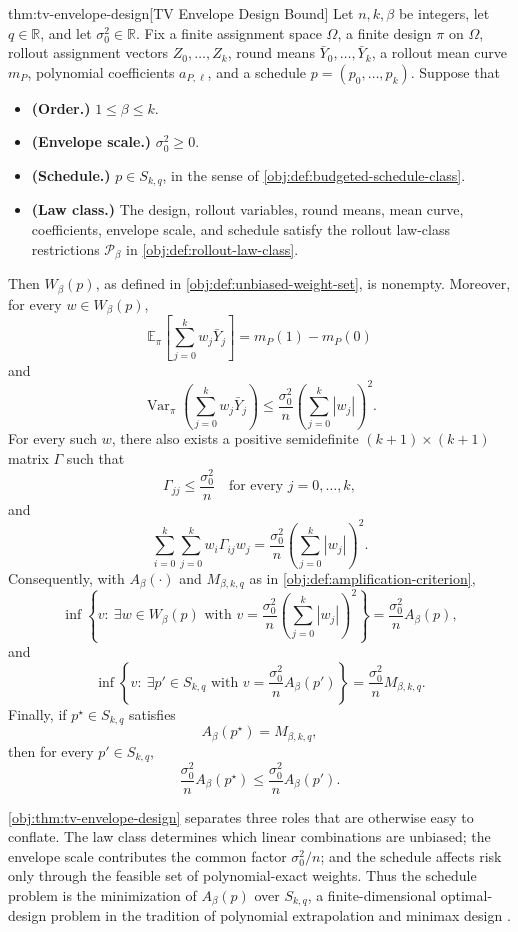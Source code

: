 \begin{theoremv}{thm:tv-envelope-design}[TV Envelope Design Bound]
Let \(n,k,\beta\) be integers, let \(q\in\mathbb R\), and let \(\sigma_0^2\in\mathbb R\). Fix a finite assignment space \(\Omega\), a finite design \(\pi\) on \(\Omega\), rollout assignment vectors \(Z_0,\ldots,Z_k\), round means \(\bar Y_0,\ldots,\bar Y_k\), a rollout mean curve \(m_P\), polynomial coefficients \(a_{P,\ell}\), and a schedule \(p=(p_0,\ldots,p_k)\). Suppose that
\begin{itemize}
\item \textbf{(Order.)} \(1\le \beta\le k\).
\item \textbf{(Envelope scale.)} \(\sigma_0^2\ge 0\).
\item \textbf{(Schedule.)} \(p\in S_{k,q}\), in the sense of \cref{obj:def:budgeted-schedule-class}.
\item \textbf{(Law class.)} The design, rollout variables, round means, mean curve, coefficients, envelope scale, and schedule satisfy the rollout law-class restrictions \(\mathcal P_\beta\) in \cref{obj:def:rollout-law-class}.
\end{itemize}
Then \(W_\beta(p)\), as defined in \cref{obj:def:unbiased-weight-set}, is nonempty. Moreover, for every \(w\in W_\beta(p)\),
\[
\mathbb E_\pi\!\left[\sum_{j=0}^k w_j\bar Y_j\right]=m_P(1)-m_P(0)
\]
and
\[
\operatorname{Var}_\pi\!\left(\sum_{j=0}^k w_j\bar Y_j\right)
\le
\frac{\sigma_0^2}{n}\left(\sum_{j=0}^k |w_j|\right)^2 .
\]
For every such \(w\), there also exists a positive semidefinite \((k+1)\times(k+1)\) matrix \(\Gamma\) such that
\[
\Gamma_{jj}\le \frac{\sigma_0^2}{n}\quad\text{for every }j=0,\ldots,k,
\]
and
\[
\sum_{i=0}^k\sum_{j=0}^k w_i\Gamma_{ij}w_j
=
\frac{\sigma_0^2}{n}\left(\sum_{j=0}^k |w_j|\right)^2 .
\]
Consequently, with \(A_\beta(\cdot)\) and \(M_{\beta,k,q}\) as in \cref{obj:def:amplification-criterion},
\[
\inf\left\{
v:\ \exists w\in W_\beta(p)\text{ with }
v=\frac{\sigma_0^2}{n}\left(\sum_{j=0}^k |w_j|\right)^2
\right\}
=
\frac{\sigma_0^2}{n}A_\beta(p),
\]
and
\[
\inf\left\{
v:\ \exists p'\in S_{k,q}\text{ with }
v=\frac{\sigma_0^2}{n}A_\beta(p')
\right\}
=
\frac{\sigma_0^2}{n}M_{\beta,k,q}.
\]
Finally, if \(p^\star\in S_{k,q}\) satisfies
\[
A_\beta(p^\star)=M_{\beta,k,q},
\]
then for every \(p'\in S_{k,q}\),
\[
\frac{\sigma_0^2}{n}A_\beta(p^\star)
\le
\frac{\sigma_0^2}{n}A_\beta(p').
\]
\end{theoremv}

\cref{obj:thm:tv-envelope-design} separates three roles that are otherwise easy to conflate. The law class determines which linear combinations are unbiased; the envelope scale contributes the common factor \(\sigma_0^2/n\); and the schedule affects risk only through the feasible set of polynomial-exact weights. Thus the schedule problem is the minimization of \(A_\beta(p)\) over \(S_{k,q}\), a finite-dimensional optimal-design problem in the tradition of polynomial extrapolation and minimax design \citep{smith1918,kiefer1959,kiefer1974,pukelsheim1993,karlin1966}.

